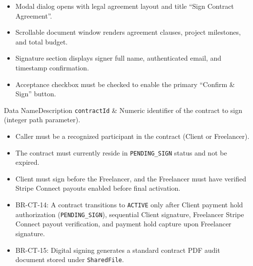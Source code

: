 \begin{itemize}[leftmargin=1.6em,topsep=3pt,itemsep=2pt,parsep=0pt,label=$\bullet$]
      \item Modal dialog opens with legal agreement layout and title ``Sign Contract Agreement''.
      \item Scrollable document window renders agreement clauses, project milestones, and total budget.
      \item Signature section displays signer full name, authenticated email, and timestamp confirmation.
      \item Acceptance checkbox must be checked to enable the primary ``Confirm \& Sign'' button.
\end{itemize}


\begin{specdatatable}{Data Name}{Description}
      \texttt{contractId} & Numeric identifier of the contract to sign (integer path parameter).\\ \hline
\end{specdatatable}

\begin{itemize}[leftmargin=1.6em,topsep=3pt,itemsep=2pt,parsep=0pt,label=$\bullet$]
      \item Caller must be a recognized participant in the contract (Client or Freelancer).
      \item The contract must currently reside in \texttt{PENDING\_SIGN} status and not be expired.
      \item Client must sign before the Freelancer, and the Freelancer must have verified Stripe Connect payouts enabled before final activation.
\end{itemize}

\begin{itemize}[leftmargin=1.6em,topsep=3pt,itemsep=2pt,parsep=0pt,label=$\bullet$]\brrulelist
      \item BR-CT-14: A contract transitions to \texttt{ACTIVE} only after Client payment hold authorization (\texttt{PENDING\_SIGN}), sequential Client signature, Freelancer Stripe Connect payout verification, and payment hold capture upon Freelancer signature.
      \item BR-CT-15: Digital signing generates a standard contract PDF audit document stored under \texttt{SharedFile}.
\end{itemize}

